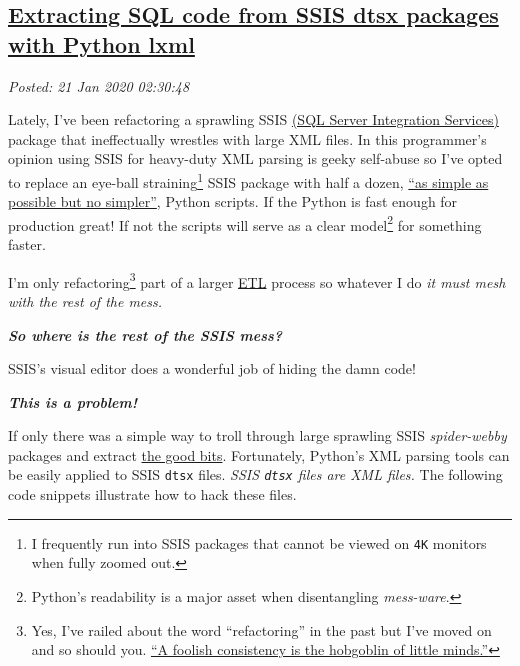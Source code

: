 %

\subsection*{\href{https://analyzethedatanotthedrivel.org/2020/01/20/extracting-sql-code-from-ssis-dtsx-packages-with-python-lxml/}{Extracting SQL code from SSIS dtsx packages with Python lxml}}


\noindent\emph{Posted: 21 Jan 2020 02:30:48}
\vspace{6pt}

Lately, I've been refactoring a sprawling SSIS
\href{https://docs.microsoft.com/en-us/sql/integration-services/sql-server-integration-services?view=sql-server-ver15}{(SQL
Server Integration Services)} package that ineffectually wrestles with
large XML files. In this programmer's opinion using SSIS for heavy-duty
XML parsing is geeky self-abuse so I've opted to replace an eye-ball
straining\footnote{
I frequently run into SSIS packages that cannot be viewed on \texttt{4K}
monitors when fully zoomed out.
} SSIS package
with half a dozen,
\href{https://quoteinvestigator.com/2011/05/13/einstein-simple/}{``as
simple as possible but no simpler''}, Python scripts. If the Python is
fast enough for production great! If not the scripts will serve as a
clear model\footnote{
Python's readability is a major asset when disentangling \emph{mess-ware}.
} for something faster.

I'm only refactoring\footnote{
Yes, I've railed about the word ``refactoring'' in the past but I've
moved on and so should you.
\href{https://www.dictionary.com/browse/a-foolish-consistency-is-the-hobgoblin-of-little-minds}{``A
foolish consistency is the hobgoblin of little minds.''}
} part of a larger \href{https://www.webopedia.com/TERM/E/ETL.html}{ETL}
process so whatever I do \emph{it must mesh with the rest of the mess.}

\medskip

\textbf{\emph{So where is the rest of the SSIS mess?}}

\medskip

SSIS's visual editor does a wonderful job of hiding the damn code!

\medskip

\textbf{\emph{This is a problem!}}

\medskip

If only there was a simple way to troll through large sprawling SSIS
\emph{spider-webby} packages and extract
\href{https://www.youtube.com/watch?v=wPiHQ37gXnE}{the good bits}.
Fortunately, Python's XML parsing tools can be easily applied to SSIS
\texttt{dtsx} files. \emph{SSIS \texttt{dtsx} files are XML files.} The
following code snippets illustrate how to hack these files.

